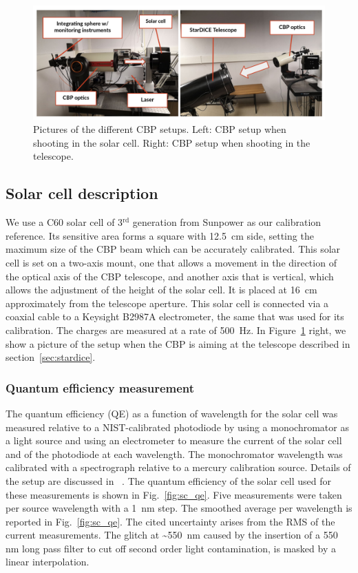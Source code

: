 \begin{figure}[ht]
\centering
\includegraphics[width=\textwidth]{fig/cbp_setup_cropped.pdf}
\caption{Pictures of the different CBP setups. Left: CBP setup when shooting in the solar cell. Right: CBP setup when shooting in the \SD telescope.}
\label{fig:cbp_setup}
\end{figure}

\subsection{Solar cell description}
\label{sec:solarcell}

We use a C60 solar cell of 3$^{\mathrm{rd}}$ generation from Sunpower as our calibration reference. Its sensitive area forms a square with \SI{12.5}{\centi\meter} side, setting the maximum size of the CBP beam which can be accurately calibrated. This solar cell is set on a two-axis mount, one that allows a movement in the direction of the optical axis of the CBP telescope, and another axis that is vertical, which allows the adjustment of the height of the solar cell. It is placed at \SI{16}{\cm} approximately from the telescope aperture. This solar cell is connected via a coaxial cable to a Keysight B2987A electrometer, the same that was used for its calibration. The charges are measured at a rate of \SI{500}{\hertz}. In Figure~\ref{fig:cbp_setup} right, we show a picture of the setup when the CBP is aiming at the \SD telescope described in section~\ref{sec:stardice}.


\subsubsection{Quantum efficiency measurement}
 
The quantum efficiency (QE) as a function of wavelength for the solar cell was
measured relative to a NIST-calibrated photodiode by using a monochromator as a
light source and using an electrometer to measure the current of the solar cell
and of the photodiode at each wavelength. The monochromator wavelength was
calibrated with a spectrograph relative to a mercury calibration source. Details
of the setup are discussed in ~\cite{solarcell}. The quantum efficiency of the
solar cell used for these measurements is shown in Fig.~\ref{fig:sc_qe}. Five
measurements were taken per source wavelength with a \SI{1}{\nm} step. The
smoothed average per wavelength is reported in Fig.~\ref{fig:sc_qe}. The cited
uncertainty arises from the RMS of the current measurements. The glitch at
\textasciitilde\SI{550}{\nm} caused by the insertion of a 550 nm long pass
filter to cut off second order light contamination, is masked by a linear
interpolation.

